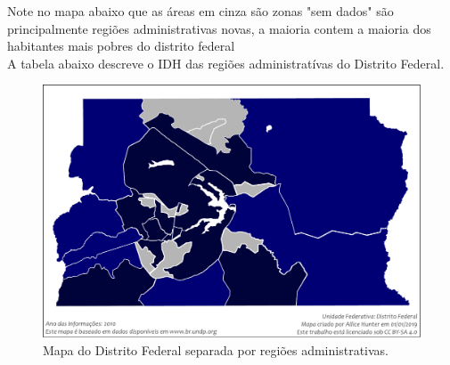 Note no mapa abaixo que as áreas em cinza são zonas "sem dados" são principalmente regiões administrativas novas, a maioria contem a maioria dos habitantes mais pobres do distrito federal\\

A tabela abaixo descreve o IDH das regiões administratívas do Distrito Federal.\\


\begin{figure}[h]
    \centering
    \includegraphics[width=0.6\linewidth]{2-caps/cap02/Mapa_do_IDH_do_Distrito_Federal_(2010)}
    \caption{Mapa do Distrito Federal separada por regiões administrativas.}
    \label{fig:mapadoidhdodistritofederal2010}
\end{figure}

